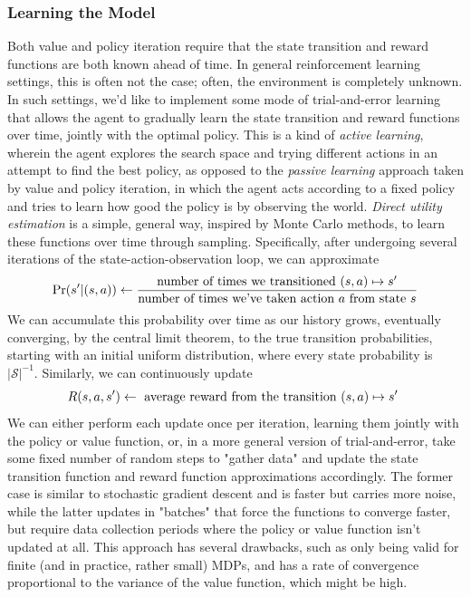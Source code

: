 \documentclass{article}
\begin{document}
\subsubsection{Learning the Model}
Both value and policy iteration require that the state transition and reward functions are both known ahead of time. In general reinforcement learning settings, this is often not the case; often, the environment is completely unknown. In such settings, we'd like to implement some mode of trial-and-error learning that allows the agent to gradually learn the state transition and reward functions over time, jointly with the optimal policy. This is a kind of \textit{active learning}, wherein the agent explores the search space and trying different actions in an attempt to find the best policy, as opposed to the \textit{passive learning} approach taken by value and policy iteration, in which the agent acts according to a fixed policy and tries to learn how good the policy is by observing the world.
\newline \newline
\textit{Direct utility estimation} is a simple, general way, inspired by Monte Carlo methods, to learn these functions over time through sampling. Specifically, after undergoing several iterations of the state-action-observation loop, we can approximate
    $$ \Pr(s' | (s, a)) \gets \frac{\text{number of times we transitioned $ (s, a) \mapsto s' $}}{\text{number of times we've taken action $ a $ from state $ s $}} $$
We can accumulate this probability over time as our history grows, eventually converging, by the central limit theorem, to the true transition probabilities, starting with an initial uniform distribution, where every state probability is $ | \mathcal{S} |^{-1} $. Similarly, we can continuously update
    $$ R(s, a, s') \gets \text{ average reward from the transition $ (s, a) \mapsto s' $ } $$
We can either perform each update once per iteration, learning them jointly with the policy or value function, or, in a more general version of trial-and-error, take some fixed number of random steps to "gather data" and update the state transition function and reward function approximations accordingly. The former case is similar to stochastic gradient descent and is faster but carries more noise, while the latter updates in "batches" that force the functions to converge faster, but require data collection periods where the policy or value function isn't updated at all. This approach has several drawbacks, such as only being valid for finite (and in practice, rather small) MDPs, and has a rate of convergence proportional to the variance of the value function, which might be high.
\end{document}
